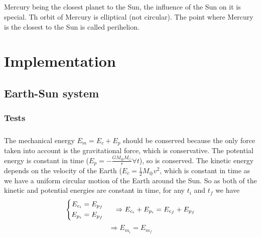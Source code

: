 \documentclass[a4paper, twoside, 11pt]{report}
\theoremstyle{theorem}
\theoremstyle{remark}
\theoremstyle{exemple}
\begin{document}
            \subsection{}
                \paragraph{}Mercury being the closest planet to the Sun, the influence of the Sun on it is special. Th orbit of Mercury is elliptical (not circular). The point where Mercury is the closest to the Sun is called perihelion. 
            


\chapter{Implementation}

    \section{Earth-Sun system}
        \subsection{}
        
        \subsection{Tests}
            \paragraph{}The mechanical energy $E_m = E_c + E_p$ should be conserved because the only force taken into account is the gravitational force, which is conservative. The potential energy is constant in time ($E_p = -\frac{GM_{\oplus}M_{\odot}}{r} \forall t$), so is conserved. The kinetic energy depends on the velocity of the Earth ($E_c = \frac{1}{2}M_{\oplus}v^2$, which is constant in time as we have a uniform circular motion of the Earth around the Sun. So as both of the kinetic and potential energies are constant in time, for any $t_i$ and $t_f$ we have
                \begin{equation*}
                    \left\{
                        \begin{aligned}
                            E_{c_i} &= E_{p_f}\\
                            E_{p_i} &= E_{p_f}
                        \end{aligned}
                    \right. \hspace{0.5cm} \Rightarrow E_{c_i} + E_{p_i} = E_{c_f} + E_{p_f}
                \end{equation*} 
                \begin{equation*}
                    \Rightarrow E_{m_i} = E_{m_f}
                \end{equation*}
                        
\end{document}
